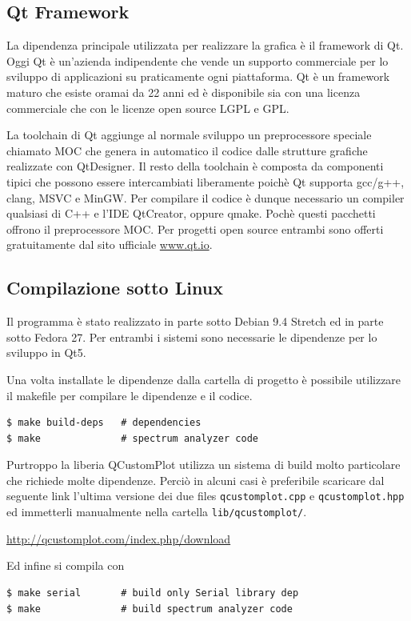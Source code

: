 \subsection{Qt Framework}
La dipendenza principale utilizzata per realizzare la grafica \`e il framework
di Qt. Oggi Qt \`e un'azienda indipendente che vende un supporto commerciale
per lo sviluppo di applicazioni su praticamente ogni piattaforma.
Qt \`e un framework maturo che esiste oramai da 22 anni ed \`e disponibile sia
con una licenza commerciale che con le licenze open source LGPL e GPL.

La toolchain di Qt aggiunge al normale sviluppo un preprocessore speciale
chiamato MOC che genera in automatico il codice dalle strutture grafiche
realizzate con QtDesigner. Il resto della toolchain \`e composta da componenti
tipici che possono essere intercambiati liberamente poich\`e Qt supporta
gcc/g++, clang, MSVC e MinGW. Per compilare il codice \`e dunque necessario un
compiler qualsiasi di C++ e l'IDE QtCreator, oppure qmake. Poch\`e questi
pacchetti offrono il preprocessore MOC. Per progetti open source entrambi sono
offerti gratuitamente dal sito ufficiale \url{www.qt.io}.

\subsection{Compilazione sotto Linux}
Il programma \`e stato realizzato in parte sotto Debian 9.4 Stretch ed in
parte sotto Fedora 27. Per entrambi i sistemi sono necessarie le dipendenze
per lo sviluppo in Qt5.

\noindent Una volta installate le dipendenze dalla cartella di progetto \`e
possibile utilizzare il makefile per compilare le dipendenze e il codice.
\begin{Verbatim}[frame=single]
$ make build-deps   # dependencies
$ make              # spectrum analyzer code 
\end{Verbatim}
Purtroppo la liberia QCustomPlot utilizza un sistema di build molto
particolare che richiede molte dipendenze. Perci\`o in alcuni casi \`e
preferibile scaricare dal seguente link l'ultima versione dei due files
\texttt{qcustomplot.cpp} e \texttt{qcustomplot.hpp} ed immetterli manualmente
nella cartella \texttt{lib/qcustomplot/}.
\begin{center}
\url{http://qcustomplot.com/index.php/download}
\end{center}
Ed infine si compila con
\begin{Verbatim}[frame=single]
$ make serial       # build only Serial library dep
$ make              # build spectrum analyzer code 
\end{Verbatim}

